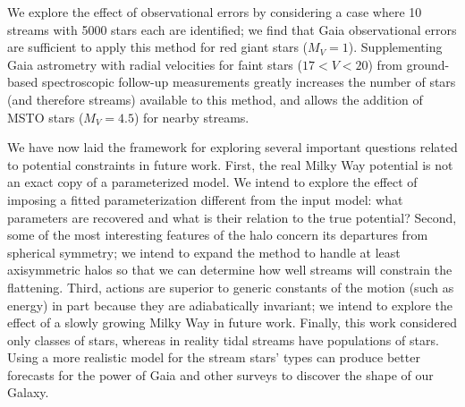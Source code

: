\documentclass{emulateapj}
\begin{document}
We explore the effect of observational errors by considering a case where 10 streams with 5000 stars each are identified; we find that Gaia observational errors are sufficient to apply this method for red giant stars ($M_V=1$). Supplementing Gaia astrometry with radial velocities for faint stars ($17<V<20$) from ground-based spectroscopic follow-up measurements greatly increases the number of stars (and therefore streams) available to this method, and allows the addition of MSTO stars ($M_V=4.5$) for nearby streams.


We have now laid the framework for exploring several important questions related to potential constraints in future work. First, the real Milky Way potential is not an exact copy of a parameterized model. We intend to explore the effect of imposing a fitted parameterization different from the input model: what parameters are recovered and what is their relation to the true potential? Second, some of the most interesting features of the halo concern its departures from spherical symmetry; we intend to expand the method to handle at least axisymmetric halos so that we can determine how well streams will constrain the flattening. Third, actions are superior to generic constants of the motion (such as energy) in part because they are adiabatically invariant; we intend to explore the effect of a slowly growing Milky Way in future work. Finally, this work considered only classes of stars, whereas in reality tidal streams have populations of stars. Using a more realistic model for the stream stars' types can produce better forecasts for the power of Gaia and other surveys to discover the shape of our Galaxy.


% 
% 
\end{document}
